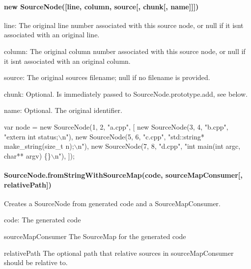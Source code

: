 \paragraph*{new Source\+Node(\mbox{[}line, column, source\mbox{[}, chunk\mbox{[}, name\mbox{]}\mbox{]}\mbox{]})}


\begin{DoxyItemize}
\item {\ttfamily line}\+: The original line number associated with this source node, or null if it isn\textquotesingle{}t associated with an original line.
\item {\ttfamily column}\+: The original column number associated with this source node, or null if it isn\textquotesingle{}t associated with an original column.
\item {\ttfamily source}\+: The original source\textquotesingle{}s filename; null if no filename is provided.
\item {\ttfamily chunk}\+: Optional. Is immediately passed to {\ttfamily Source\+Node.\+prototype.\+add}, see below.
\item {\ttfamily name}\+: Optional. The original identifier.
\end{DoxyItemize}


\begin{DoxyCode}
var node = new SourceNode(1, 2, "a.cpp", [
  new SourceNode(3, 4, "b.cpp", "extern int status;\(\backslash\)n"),
  new SourceNode(5, 6, "c.cpp", "std::string* make\_string(size\_t n);\(\backslash\)n"),
  new SourceNode(7, 8, "d.cpp", "int main(int argc, char** argv) \{\}\(\backslash\)n"),
]);
\end{DoxyCode}


\paragraph*{Source\+Node.\+from\+String\+With\+Source\+Map(code, source\+Map\+Consumer\mbox{[}, relative\+Path\mbox{]})}

Creates a Source\+Node from generated code and a Source\+Map\+Consumer.


\begin{DoxyItemize}
\item {\ttfamily code}\+: The generated code
\item {\ttfamily source\+Map\+Consumer} The Source\+Map for the generated code
\item {\ttfamily relative\+Path} The optional path that relative sources in {\ttfamily source\+Map\+Consumer} should be relative to.
\end{DoxyItemize}


